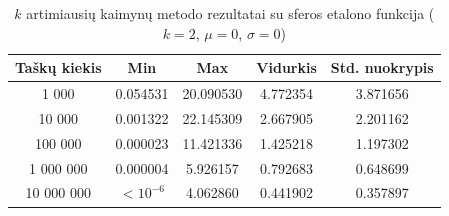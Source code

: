 \begin{table}[H]
    \centering
    \begin{tabular}{|c|c|c|c|c|}
        \hline
        \textbf{Taškų kiekis} & \textbf{Min} & \textbf{Max} & \textbf{Vidurkis} & \textbf{Std. nuokrypis} \\ \hline
        1 000        & 0.054531 & 20.090530 & 4.772354 & 3.871656 \\ \hline
        10 000       & 0.001322 & 22.145309 & 2.667905 & 2.201162 \\ \hline
        100 000      & 0.000023 & 11.421336 & 1.425218 & 1.197302 \\ \hline
        1 000 000    & 0.000004 & 5.926157 & 0.792683 & 0.648699 \\ \hline
        10 000 000   & $<10^{-6}$ & 4.062860 & 0.441902 & 0.357897 \\ \hline
    \end{tabular}
    \caption{$k$ artimiausių kaimynų metodo rezultatai su sferos etalono funkcija ($k = 2$, $\mu = 0$, $\sigma = 0$)}
\end{table}